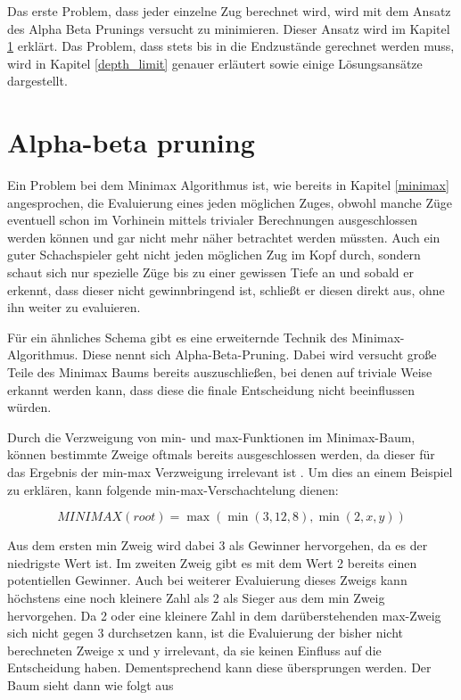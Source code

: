 
Das erste Problem, dass jeder einzelne Zug berechnet wird, wird mit dem Ansatz des Alpha Beta Prunings versucht zu minimieren. Dieser Ansatz wird im Kapitel \ref{alpha_beta} erklärt. Das Problem, dass stets bis in die Endzustände gerechnet werden muss, wird in Kapitel \ref{depth_limit} genauer erläutert sowie einige Lösungsansätze dargestellt.




\section{Alpha-beta pruning}\label{alpha_beta}

Ein Problem bei dem Minimax Algorithmus ist, wie bereits in Kapitel \ref{minimax} angesprochen, die Evaluierung eines jeden möglichen Zuges, obwohl manche Züge eventuell schon im Vorhinein mittels trivialer Berechnungen ausgeschlossen werden können und gar nicht mehr näher betrachtet werden müssten. Auch ein guter Schachspieler geht nicht jeden möglichen Zug im Kopf durch, sondern schaut sich nur spezielle Züge bis zu einer gewissen Tiefe an und sobald er erkennt, dass dieser nicht gewinnbringend ist, schließt er diesen direkt aus, ohne ihn weiter zu evaluieren.

Für ein ähnliches Schema gibt es eine erweiternde Technik des Minimax-Algorithmus. Diese nennt sich Alpha-Beta-Pruning. Dabei wird versucht große Teile des Minimax Baums bereits auszuschließen, bei denen auf triviale Weise erkannt werden kann, dass diese die finale Entscheidung nicht beeinflussen würden. 

Durch die Verzweigung von min- und max-Funktionen im Minimax-Baum, können bestimmte Zweige oftmals bereits ausgeschlossen werden, da dieser für das Ergebnis der min-max Verzweigung irrelevant ist \cite{Russell2010}. Um dies an einem Beispiel zu erklären, kann folgende min-max-Verschachtelung dienen:

\begin{equation}
MINIMAX(root) = \max(\min(3,12,8), \min(2,x,y))
\end{equation}

Aus dem ersten min Zweig wird dabei 3 als Gewinner hervorgehen, da es der niedrigste Wert ist. Im zweiten Zweig gibt es mit dem Wert 2 bereits einen potentiellen Gewinner. Auch bei weiterer Evaluierung dieses Zweigs kann höchstens eine noch kleinere Zahl als 2 als Sieger aus dem min Zweig hervorgehen. Da 2 oder eine kleinere Zahl in dem darüberstehenden max-Zweig sich nicht gegen 3 durchsetzen kann, ist die Evaluierung der bisher nicht berechneten Zweige x und y irrelevant, da sie keinen Einfluss auf die Entscheidung haben. Dementsprechend kann diese übersprungen werden. Der Baum sieht dann wie folgt aus

